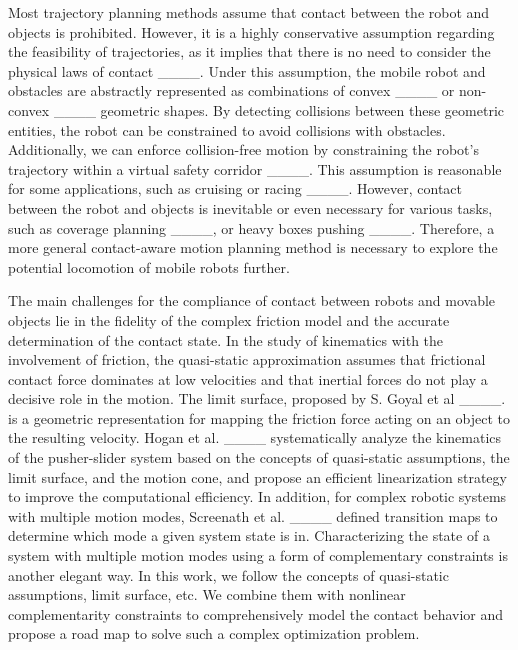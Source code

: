 Most trajectory planning methods assume that contact between the robot and objects is prohibited. However, it is a highly conservative assumption regarding the feasibility of trajectories, as it implies that there is no need to consider the physical laws of contact ____. Under this assumption, the mobile robot and obstacles are abstractly represented as combinations of convex ____ or non-convex ____ geometric shapes. By detecting collisions between these geometric entities, the robot can be constrained to avoid collisions with obstacles. Additionally, we can enforce collision-free motion by constraining the robot's trajectory within a virtual safety corridor ____. This assumption is reasonable for some applications, such as cruising or racing ____. However, contact between the robot and objects is inevitable or even necessary for various tasks, such as coverage planning ____, or heavy boxes pushing ____. Therefore, a more general contact-aware motion planning method is necessary to explore the potential locomotion of mobile robots further. 

The main challenges for the compliance of contact between robots and movable objects lie in the fidelity of the complex friction model and the accurate determination of the contact state. In the study of kinematics with the involvement of friction, the quasi-static approximation assumes that frictional contact force dominates at low velocities and that inertial forces do not play a decisive role in the motion. %
The limit surface, proposed by S. Goyal et al ____. is a geometric representation for mapping the friction force acting on an object to the resulting velocity. Hogan et al. ____ systematically analyze the kinematics of the pusher-slider system based on the concepts of quasi-static assumptions, the limit surface, and the motion cone, and propose an efficient linearization strategy to improve the computational efficiency. In addition, for complex robotic systems with multiple motion modes, Screenath et al. ____ defined transition maps to determine which mode a given system state is in. Characterizing the state of a system with multiple motion modes using a form of complementary constraints is another elegant way. %
In this work, we follow the concepts of quasi-static assumptions, limit surface, etc. We combine them with nonlinear complementarity constraints to comprehensively model the contact behavior and propose a road map to solve such a complex optimization problem.

